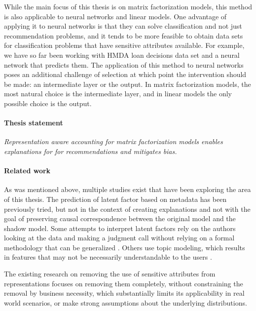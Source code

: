While the main focus of this thesis is on matrix factorization models, this
method is also applicable to neural networks and linear models. One advantage of
applying it to neural networks is that they can solve classification and not
just recommendation problems, and it tends to be more feasible to obtain data
sets for classification problems that have sensitive attributes available. For
example, we have so far been working with HMDA loan decisions data set and a
neural network that predicts them. The application of this method to neural
networks poses an additional challenge of selection at which point the
intervention should be made: an intermediate layer or the output. In matrix
factorization models, the most natural choice is the intermediate layer, and in
linear models the only possible choice is the output.

\paragraph{Thesis statement}

\emph{Representation aware accounting for matrix factorization models enables
explanations for for recommendations and mitigates bias.}

\paragraph{Related work}

As was mentioned above, multiple studies exist that have been exploring the
area of this thesis. The prediction of latent factor based on metadata has been
previously tried\cite{gantner2010learning}, but not in the context of creating
explanations and not with the goal of preserving causal correspondence between
the original model and the shadow model. Some attempts to interpret latent
factors rely on the authors looking at the data and making a judgment call
without relying on a formal methodology that can be generalized
\cite{koren2009matrix}. Others use topic modeling, which results in features
that may not be necessarily understandable to the users
\cite{rossetti2013towards}.


The existing research on removing the use of sensitive attributes from
representations focuses on removing them completely, without constraining the
removal by business necessity, which substantially limits its applicability in
real world scenarios\cite{Beutel2017DataDA}, or make strong assumptions about
the underlying distributions\cite{Kamishima}.


